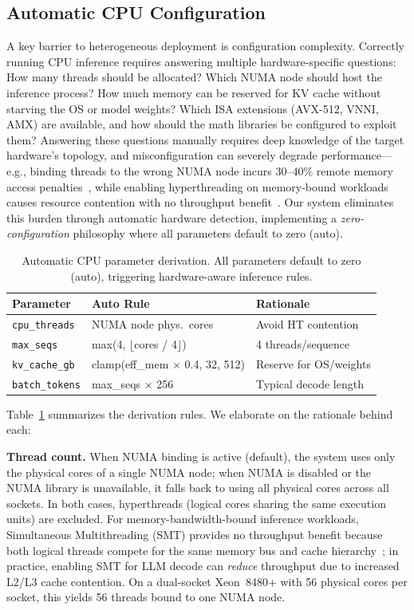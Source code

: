 \documentclass[10pt,conference]{IEEEtran}
\begin{document}
\subsection{Automatic CPU Configuration}
\label{sec:autoconfig}

A key barrier to heterogeneous deployment is configuration complexity.
Correctly running CPU inference requires answering multiple hardware-specific questions: How many threads should be allocated? Which NUMA node should host the inference process? How much memory can be reserved for KV cache without starving the OS or model weights? Which ISA extensions (AVX-512, VNNI, AMX) are available, and how should the math libraries be configured to exploit them?
Answering these questions manually requires deep knowledge of the target hardware's topology, and misconfiguration can severely degrade performance---e.g., binding threads to the wrong NUMA node incurs 30--40\% remote memory access penalties~\cite{lameter2013numa}, while enabling hyperthreading on memory-bound workloads causes resource contention with no throughput benefit~\cite{eyerman2010smt}.
Our system eliminates this burden through automatic hardware detection, implementing a \emph{zero-configuration} philosophy where all parameters default to zero (auto).

\begin{table}[t]
\centering
\caption{Automatic CPU parameter derivation. All parameters default to zero (auto), triggering hardware-aware inference rules.}
\label{tab:autoconfig}
\footnotesize
\begin{tabular}{@{}lll@{}}
\toprule
\textbf{Parameter} & \textbf{Auto Rule} & \textbf{Rationale} \\
\midrule
\texttt{cpu\_threads} & NUMA node phys.\ cores & Avoid HT contention \\
\texttt{max\_seqs} & max(4, $\lfloor$cores / 4$\rfloor$) & 4 threads/sequence \\
\texttt{kv\_cache\_gb} & clamp(eff\_mem $\times$ 0.4, 32, 512) & Reserve for OS/weights \\
\texttt{batch\_tokens} & max\_seqs $\times$ 256 & Typical decode length \\
\bottomrule
\end{tabular}
\end{table}

Table~\ref{tab:autoconfig} summarizes the derivation rules.
We elaborate on the rationale behind each:

\textbf{Thread count.}
When NUMA binding is active (default), the system uses only the physical cores of a single NUMA node; when NUMA is disabled or the NUMA library is unavailable, it falls back to using all physical cores across all sockets. In both cases, hyperthreads (logical cores sharing the same execution units) are excluded.
For memory-bandwidth-bound inference workloads, Simultaneous Multithreading (SMT) provides no throughput benefit because both logical threads compete for the same memory bus and cache hierarchy~\cite{eyerman2010smt}; in practice, enabling SMT for LLM decode can \emph{reduce} throughput due to increased L2/L3 cache contention.
On a dual-socket Xeon~8480+ with 56 physical cores per socket, this yields 56 threads bound to one NUMA node.
\end{document}
